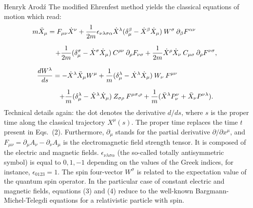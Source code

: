 \begin{artengenv}{Henryk Arod\'z}
The modified Ehrenfest method yields the classical equations of motion which read: 
\[\hspace*{-1.3cm} m \ddot{X}_{\mu} = F_{\mu\nu}\dot{X}^{\nu}+ \frac{1}{2m} \epsilon_{\nu\lambda\sigma\alpha}\dot{X}^{\lambda} (\delta^{\beta}_{\mu}- \dot{X}^{\beta} \dot{X}_{\mu}) \:W^{\sigma} \:\partial_{\beta}F^{\alpha\nu} \] 

\vspace*{-0.7cm}
\begin{equation} \hspace*{1.0cm} + \frac{1}{2m} (\delta^{\sigma}_{\mu}- \dot{X}^{\sigma} \dot{X}_{\mu}) \:C^{\rho\nu}\: \partial_{\rho}F_{\nu\sigma} + \frac{1}{2m} \dot{X}^{\rho} \dot{X}_{\nu} \: C_{\mu\sigma}\:\partial_{\rho} F^{\nu\sigma}, \end{equation}

\vspace*{-0.4cm}
\[ \frac{dW^{\lambda}}{ds} = - \dot{X}^{\lambda} \ddot{X}_{\mu}W^{\mu} + \frac{1}{m} (\delta^{\lambda}_{\mu}- \dot{X}^{\lambda} \dot{X}_{\mu}) \:W_{\nu}\:F^{\mu\nu} \hspace*{2cm} \] 

\vspace*{-1cm}
 \begin{equation} \hspace*{1cm} + \frac{1}{m} (\delta^{\lambda}_{\mu}- \dot{X}^{\lambda} \dot{X}_{\mu})\:Z_{\sigma \rho}\: F^{\mu\sigma,\rho} + \frac{1}{m} (\ddot{X}^{\lambda} P^{\nu}_{\nu} + \ddot{X}_{\nu}P^{\nu\lambda}). \end{equation}
Technical details again: the dot denotes the derivative $d/ ds$, where $s$ is the proper time along the classical trajectory $X^{\mu}(s)$. The proper time replaces the time $t$ present in Eqs.\ (2). Furthermore, $\partial_{\mu}$ stands for the partial derivative $\partial/ \partial x^{\mu}$, and 
$F_{\mu\nu} = \partial_{\mu} A_{\nu} - \partial_{\nu} A_{\mu} $ is the electromagnetic field strength tensor. It is composed of the electric and magnetic fields. $\epsilon_{\nu\lambda \sigma \alpha}$ (the so-called totally antisymmetric symbol) is equal to $0, 1, -1$ depending on the values of the Greek indices, for instance, $\epsilon_{0123} =1$. 
The spin four-vector $ W^{\sigma}$ is related to the expectation value of the quantum spin operator. In the particular case of constant electric and magnetic fields, equations (3) and (4) reduce to the well-known Bargmann-Michel-Telegdi equations for a relativistic particle with spin. 

 


\end{artengenv}
